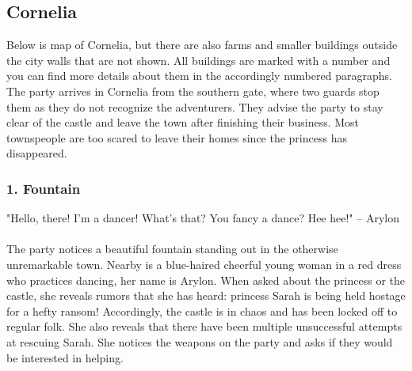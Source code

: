 \subsection*{Cornelia}
Below is map of Cornelia, but there are also farms and smaller buildings outside the city walls that are not shown.
All buildings are marked with a number and you can find more details about them in the accordingly numbered paragraphs.
The party arrives in Cornelia from the southern gate, where two guards stop them as they do not recognize the adventurers.
They advise the party to stay clear of the castle and leave the town after finishing their business.
Most townspeople are too scared to leave their homes since the princess has disappeared.
\begin{center} 
\end{center}
\subsubsection*{1. Fountain}
"Hello, there! I'm a dancer! What's that? You fancy a dance? Hee hee!"
-- Arylon \\ \\
The party notices a beautiful fountain standing out in the otherwise unremarkable town.
Nearby is a blue-haired cheerful young woman in a red dress who practices dancing, her name is Arylon.
When asked about the princess or the castle, she reveals rumors that she has heard: princess Sarah is being held hostage for a hefty ransom!
Accordingly, the castle is in chaos and has been locked off to regular folk.
She also reveals that there have been multiple unsuccessful attempts at rescuing Sarah.
She notices the weapons on the party and asks if they would be interested in helping.
 
